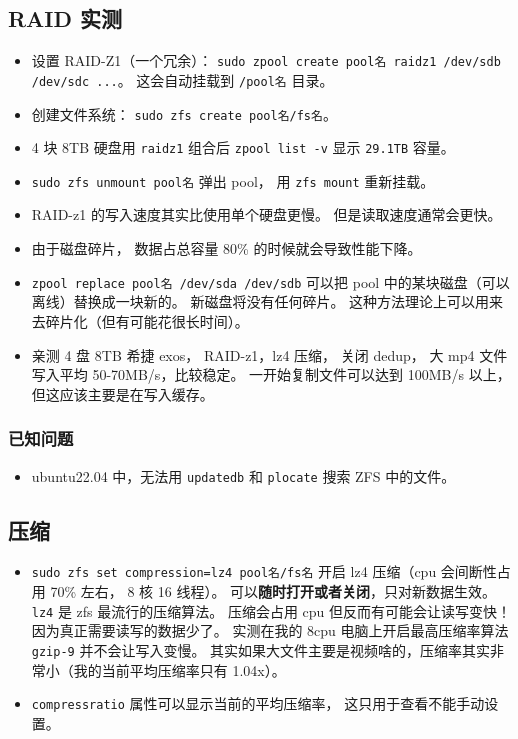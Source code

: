 \subsection{RAID 实测}
\begin{itemize}
\item 设置 RAID-Z1（一个冗余）： \verb`sudo zpool create pool名 raidz1 /dev/sdb /dev/sdc ...`。 这会自动挂载到 \verb`/pool名` 目录。
\item 创建文件系统： \verb`sudo zfs create pool名/fs名`。
\item 4 块 8TB 硬盘用 \verb`raidz1` 组合后 \verb`zpool list -v` 显示 \verb`29.1TB` 容量。
\item \verb`sudo zfs unmount pool名` 弹出 pool， 用 \verb`zfs mount` 重新挂载。
\item RAID-z1 的写入速度其实比使用单个硬盘更慢。 但是读取速度通常会更快。
\item 由于磁盘碎片， 数据占总容量 80\% 的时候就会导致性能下降。
\item \verb`zpool replace pool名 /dev/sda /dev/sdb` 可以把 pool 中的某块磁盘（可以离线）替换成一块新的。 新磁盘将没有任何碎片。 这种方法理论上可以用来去碎片化（但有可能花很长时间）。
\item 亲测 4 盘 8TB 希捷 exos， RAID-z1，lz4 压缩， 关闭 dedup， 大 mp4 文件写入平均 50-70MB/s，比较稳定。 一开始复制文件可以达到 100MB/s 以上，但这应该主要是在写入缓存。
\end{itemize}

\subsubsection{已知问题}
\begin{itemize}
\item ubuntu22.04 中，无法用 \verb`updatedb` 和 \verb`plocate` 搜索 ZFS 中的文件。
\end{itemize}

\subsection{压缩}
\begin{itemize}
\item \verb`sudo zfs set compression=lz4 pool名/fs名` 开启 lz4 压缩（cpu 会间断性占用 70\% 左右， 8 核 16 线程）。 可以\textbf{随时打开或者关闭}，只对新数据生效。 \verb`lz4` 是 zfs 最流行的压缩算法。 压缩会占用 cpu 但反而有可能会让读写变快！ 因为真正需要读写的数据少了。 实测在我的 8cpu 电脑上开启最高压缩率算法 \verb`gzip-9` 并不会让写入变慢。 其实如果大文件主要是视频啥的，压缩率其实非常小（我的当前平均压缩率只有 1.04x）。
\item \verb`compressratio` 属性可以显示当前的平均压缩率， 这只用于查看不能手动设置。
\end{itemize}

